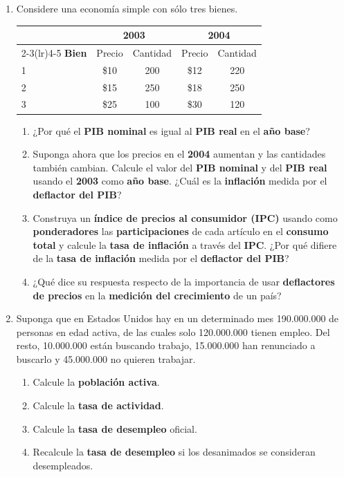 \documentclass[11pt,addpoints]{article}
\begin{document}
\begin{enumerate}
\item Considere una economía simple con sólo tres bienes. 
\\
\begin{center}
\setlength{\tabcolsep}{8pt}
\begin{tabular}{lcccc}
\toprule
 & \multicolumn{2}{c}{\textbf{2003}} & \multicolumn{2}{c}{\textbf{2004}}\\
\cmidrule(lr){2-3}\cmidrule(lr){4-5}
\textbf{Bien} & Precio & Cantidad & Precio & Cantidad\\
\midrule
1 & \$10 & 200 & \$12 & 220\\
2 & \$15 & 250 & \$18 & 250\\
3 & \$25 & 100 & \$30 & 120\\
\bottomrule
\end{tabular}
\end{center}
\begin{enumerate}[label=(\alph*)]
\item ¿Por qué el \textbf{PIB nominal} es igual al \textbf{PIB real} en el \textbf{año base}?
\item Suponga ahora que los precios en el \textbf{2004} aumentan y las cantidades también cambian.
Calcule el valor del \textbf{PIB nominal} y del \textbf{PIB real} usando el \textbf{2003} como \textbf{año base}. 
¿Cuál es la \textbf{inflación} medida por el \textbf{deflactor del PIB}?
\item Construya un \textbf{índice de precios al consumidor (IPC)} usando como \textbf{ponderadores} 
las \textbf{participaciones} de cada artículo en el \textbf{consumo total} y calcule la \textbf{tasa de inflación} a través del \textbf{IPC}. 
¿Por qué difiere de la \textbf{tasa de inflación} medida por el \textbf{deflactor del PIB}?
\item ¿Qué dice su respuesta respecto de la importancia de usar \textbf{deflactores de precios} 
en la \textbf{medición del crecimiento} de un país?
\end{enumerate}


\item Suponga que en Estados Unidos hay en un determinado mes 190.000.000 de personas en
edad
activa, de las cuales solo 120.000.000 tienen empleo. Del resto, 10.000.000 están buscando
trabajo,
15.000.000 han renunciado a buscarlo y 45.000.000 no quieren trabajar.
\begin{enumerate}[label=(\alph*)]
\item Calcule la \textbf{población activa}.
\item Calcule la \textbf{tasa de actividad}.
\item Calcule la \textbf{tasa de desempleo} oficial.
\item Recalcule la \textbf{tasa de desempleo} si los desanimados se consideran desempleados.
\end{enumerate}


\end{enumerate}
\end{document}
